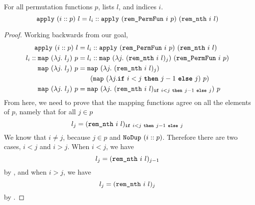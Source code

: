 \documentclass[sigplan,10pt,anonymous,review]{thesis}
\begin{document}
\begin{theorem}
  For all permutation functions $p$, lists $l$, and indices $i$.
  \begin{equation*}
    \texttt{\textup{apply}}~(i::p)~l =
    l_i :: \texttt{\textup{apply}}~(\texttt{\textup{rem\_PermFun}}~i~p)~(\texttt{\textup{rem\_nth}}~i~l)
  \end{equation*}
\end{theorem}
\begin{proof}
  Working backwards from our goal,
  \begin{align*}
    \texttt{\textup{apply}}~(i::p)~l &=
    l_i :: \texttt{\textup{apply}}~(\texttt{\textup{rem\_PermFun}}~i~p)~(\texttt{\textup{rem\_nth}}~i~l) \\
    l_i :: \texttt{\textup{map}}~(\lambda j.~l_j)~p &=
    l_i :: \texttt{\textup{map}}~(\lambda j.~(\texttt{\textup{rem\_nth}}~i~l)_j)~(\texttt{\textup{rem\_PermFun}}~i~p) \\
    \texttt{\textup{map}}~(\lambda j.~l_j)~p &=
    \texttt{\textup{map}}~(\lambda j.~(\texttt{\textup{rem\_nth}}~i~l)_j)\\
      &\phantom{=} \quad (\texttt{\textup{map}}~(\lambda j. \texttt{\textbf{if}}~i < j~\texttt{\textbf{then}}~j-1~\texttt{\textbf{else}}~j)~p) \\
    \texttt{\textup{map}}~(\lambda j.~l_j)~p &=
    \texttt{\textup{map}}~(\lambda j.~(\texttt{\textup{rem\_nth}}~i~l)_{\texttt{\textbf{if}}~i < j~\texttt{\textbf{then}}~j-1~\texttt{\textbf{else}}~j})~p \\
  \end{align*}
  From here, we need to prove that the mapping functions agree on all
  the elements of $p$, namely that for all $j \in p$
  \begin{equation*}
    l_j = (\texttt{\textup{rem\_nth}}~i~l)_{\texttt{\textbf{if}}~i < j~\texttt{\textbf{then}}~j-1~\texttt{\textbf{else}}~j}
  \end{equation*}
  We know that $i \neq j$, because $j \in p$ and $\texttt{\textup{NoDup}}~(i :: p)$.
  Therefore there are two cases, $i < j$ and $i > j$. When $i < j$, we have
  \begin{equation*}
    l_j = (\texttt{\textup{rem\_nth}}~i~l)_{j-1}
  \end{equation*}
  by , and when $i > j$, we have
  \begin{equation*}
    l_j = (\texttt{\textup{rem\_nth}}~i~l)_j
  \end{equation*}
  by .
\end{proof}
\end{document}
